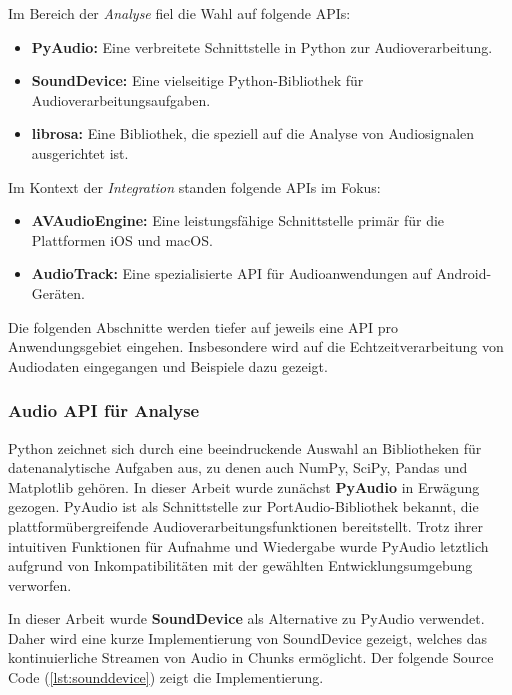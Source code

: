 \documentclass[11pt,a4paper]{article}
\begin{document}
\noindent \newline
Im Bereich der \textit{Analyse} fiel die Wahl auf folgende APIs:

\begin{itemize}[itemsep=0pt, parsep=0pt]
	\item \textbf{PyAudio:} Eine verbreitete Schnittstelle in Python zur Audioverarbeitung.
	\item \textbf{SoundDevice:} Eine vielseitige Python-Bibliothek für Audioverarbeitungsaufgaben.
	\item \textbf{librosa:} Eine Bibliothek, die speziell auf die Analyse von Audiosignalen
	      ausgerichtet ist.
\end{itemize}

\noindent
Im Kontext der \textit{Integration} standen folgende APIs im Fokus:

\begin{itemize}[itemsep=0pt, parsep=0pt]
	\item \textbf{AVAudioEngine:} Eine leistungsfähige Schnittstelle primär für die Plattformen iOS
	      und macOS.
	\item \textbf{AudioTrack:} Eine spezialisierte API für Audioanwendungen auf Android-Geräten.
\end{itemize}

\noindent
Die folgenden Abschnitte werden tiefer auf jeweils eine API pro Anwendungsgebiet eingehen. 
Insbesondere wird auf die Echtzeitverarbeitung von Audiodaten eingegangen und Beispiele dazu
gezeigt.

\subsubsection{Audio API für Analyse}
Python zeichnet sich durch eine beeindruckende Auswahl an Bibliotheken für datenanalytische Aufgaben
aus, zu denen auch NumPy, SciPy, Pandas und Matplotlib gehören. In dieser Arbeit wurde zunächst
\textbf{PyAudio} in Erwägung gezogen. PyAudio ist als Schnittstelle zur PortAudio-Bibliothek
bekannt, die plattformübergreifende Audioverarbeitungsfunktionen bereitstellt. Trotz ihrer
intuitiven Funktionen für Aufnahme und Wiedergabe wurde PyAudio letztlich aufgrund von
Inkompatibilitäten mit der gewählten Entwicklungsumgebung verworfen.


\noindent \newline
In dieser Arbeit wurde \textbf{SoundDevice} als Alternative zu PyAudio verwendet. Daher wird eine 
kurze Implementierung von SoundDevice gezeigt, welches das kontinuierliche Streamen von Audio in
Chunks ermöglicht. Der folgende Source Code (\ref{lst:sounddevice}) zeigt die Implementierung.
\end{document}
